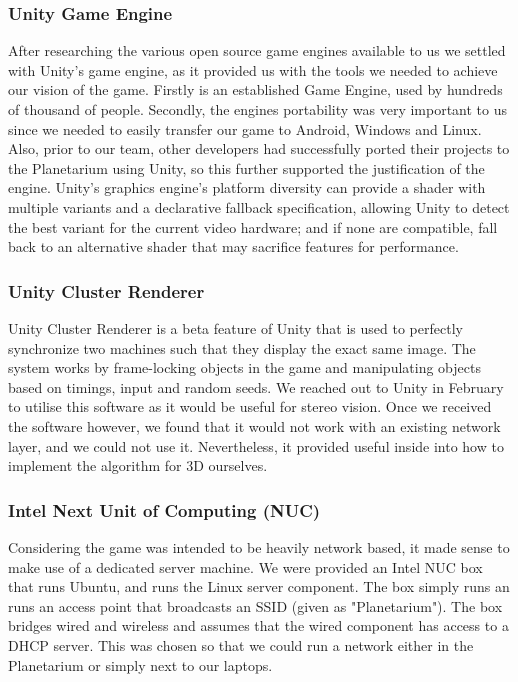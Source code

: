 \documentclass[11pt,a4paper]{article}
\begin{document}
 \subsubsection{  Unity Game Engine}

 After researching the various open source game engines available to us we settled with Unity’s game engine, as it provided us with the tools we needed to achieve our vision of the game. Firstly is an established Game Engine, used by hundreds of thousand of people. Secondly, the engines portability was very important to us since we needed to easily transfer our game to Android, Windows and Linux. Also, prior to our team, other developers had successfully ported their projects to the Planetarium using Unity, so this further supported the justification of the engine. Unity's graphics engine's platform diversity can provide a shader with multiple variants and a declarative fallback specification, allowing Unity to detect the best variant for the current video hardware; and if none are compatible, fall back to an alternative shader that may sacrifice features for performance.

 \subsubsection{ Unity Cluster Renderer}
Unity Cluster Renderer is a beta feature of Unity that is used to perfectly synchronize two machines such that they display the exact same image. The system works by frame-locking objects in the game and manipulating objects based on timings, input and random seeds. We reached out to Unity in February to utilise this software as it would be useful for stereo vision. Once we received the software however, we found that it would not work with an existing network layer, and we could not use it. Nevertheless, it provided useful inside into how to implement the algorithm for 3D ourselves.

 \subsubsection{ Intel Next Unit of Computing (NUC)}
Considering the game was intended to be heavily network based, it made sense to make use of a dedicated server machine. We were provided an Intel NUC box that runs Ubuntu, and runs the Linux server component. The box simply runs an runs an access point that broadcasts an SSID (given as "Planetarium"). The box bridges wired and wireless and assumes that the wired component has access to a DHCP server. This was chosen so that we could run a network either in the Planetarium or simply next to our laptops.
\end{document}
